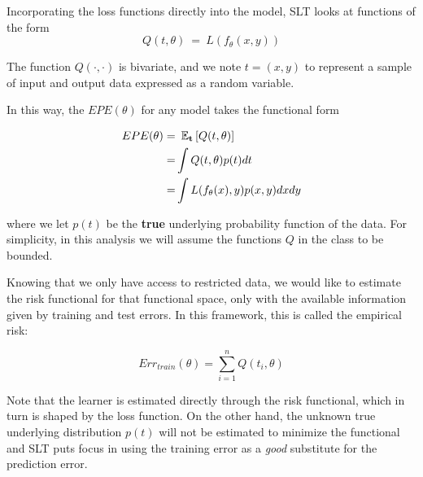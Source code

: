 \begin{appendices}
Incorporating the loss functions directly into the model, SLT looks at functions of the form $$Q(t,\theta) \ = \ L(f_\theta(x,y))$$

The function $Q(\cdot,\cdot)$ is bivariate, and we note $t=(x,y)$ to represent a sample of input and output data expressed as a random variable.%

In this way, the $EPE(\theta)$ for any model takes the functional form


\begin{equation}
\begin{split}
EPE(\theta) = & \ \operatorname{\mathbb{E}}_{\textbf{t}} \left[ Q(t,\theta) \right]\\
= & \int Q(t,\theta) p(t) dt \\
= & \int L(f_\theta(x),y) p(x,y) dx dy
\end{split}
\end{equation}\label{eq:vapnik-risk}

where we let $p(t)$ be the \textbf{true} underlying probability function of the data.
For simplicity, in this analysis we will assume the functions $Q$ in the class to be bounded.

Knowing that we only have access to restricted data, we would like to estimate the risk functional for that functional space, only with the available information given by training and test errors.
In this framework, this is called the empirical risk:

\begin{equation}\label{vapnik-empiricalRisk}
Err_{train}(\theta) = \sum_{i=1}^n Q(t_i,\theta)
\end{equation}

Note that the learner is estimated directly through the risk functional, which in turn is shaped by the loss function.
On the other hand, the unknown true underlying distribution $p(t)$ will not be estimated to minimize the functional and SLT puts focus in using the training error as a \textit{good} substitute for the prediction error.





\end{appendices}
